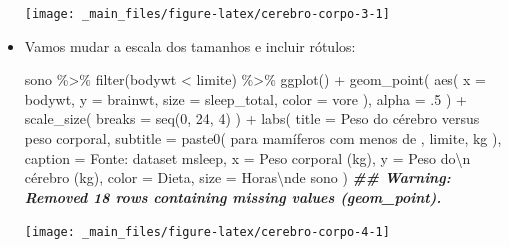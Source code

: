 \documentclass[
  11pt]{report}
\newenvironment{Shaded}{\begin{snugshade}}{\end{snugshade}}
\newcommand{\AttributeTok}[1]{\textcolor[rgb]{0.77,0.63,0.00}{#1}}
\newcommand{\DecValTok}[1]{\textcolor[rgb]{0.00,0.00,0.81}{#1}}
\newcommand{\DocumentationTok}[1]{\textcolor[rgb]{0.56,0.35,0.01}{\textbf{\textit{#1}}}}
\newcommand{\FunctionTok}[1]{\textcolor[rgb]{0.00,0.00,0.00}{#1}}
\newcommand{\NormalTok}[1]{#1}
\newcommand{\SpecialCharTok}[1]{\textcolor[rgb]{0.00,0.00,0.00}{#1}}
\newcommand{\StringTok}[1]{\textcolor[rgb]{0.31,0.60,0.02}{#1}}
\begin{document}
\begin{itemize}
  \begin{center}\texttt{[image: \_main\_files/figure-latex/cerebro-corpo-3-1]} \end{center}
\item
  Vamos mudar a escala dos tamanhos e incluir rótulos:

\begin{Shaded}
\begin{Highlighting}[]
\NormalTok{sono }\SpecialCharTok{\%\textgreater{}\%} 
  \FunctionTok{filter}\NormalTok{(bodywt }\SpecialCharTok{\textless{}}\NormalTok{ limite) }\SpecialCharTok{\%\textgreater{}\%} 
  \FunctionTok{ggplot}\NormalTok{() }\SpecialCharTok{+}
    \FunctionTok{geom\_point}\NormalTok{(}
      \FunctionTok{aes}\NormalTok{(}
        \AttributeTok{x =}\NormalTok{ bodywt, }
        \AttributeTok{y =}\NormalTok{ brainwt,}
        \AttributeTok{size =}\NormalTok{ sleep\_total,}
        \AttributeTok{color =}\NormalTok{ vore}
\NormalTok{      ), }
      \AttributeTok{alpha =}\NormalTok{ .}\DecValTok{5}
\NormalTok{    ) }\SpecialCharTok{+}
    \FunctionTok{scale\_size}\NormalTok{(}
      \AttributeTok{breaks =} \FunctionTok{seq}\NormalTok{(}\DecValTok{0}\NormalTok{, }\DecValTok{24}\NormalTok{, }\DecValTok{4}\NormalTok{)}
\NormalTok{    ) }\SpecialCharTok{+}
    \FunctionTok{labs}\NormalTok{(}
      \AttributeTok{title =} \StringTok{\textquotesingle{}Peso do cérebro versus peso corporal\textquotesingle{}}\NormalTok{,}
      \AttributeTok{subtitle =} \FunctionTok{paste0}\NormalTok{(}
        \StringTok{\textquotesingle{}para mamíferos com menos de \textquotesingle{}}\NormalTok{, }
\NormalTok{        limite, }
        \StringTok{\textquotesingle{} kg\textquotesingle{}}
\NormalTok{      ),}
      \AttributeTok{caption =} \StringTok{\textquotesingle{}Fonte: dataset \textasciigrave{}msleep\textasciigrave{}\textquotesingle{}}\NormalTok{,}
      \AttributeTok{x =} \StringTok{\textquotesingle{}Peso corporal (kg)\textquotesingle{}}\NormalTok{,}
      \AttributeTok{y =} \StringTok{\textquotesingle{}Peso do}\SpecialCharTok{\textbackslash{}n}\StringTok{ cérebro (kg)\textquotesingle{}}\NormalTok{,}
      \AttributeTok{color =} \StringTok{\textquotesingle{}Dieta\textquotesingle{}}\NormalTok{,}
      \AttributeTok{size =} \StringTok{\textquotesingle{}Horas}\SpecialCharTok{\textbackslash{}n}\StringTok{de sono\textquotesingle{}}
\NormalTok{    )}
\DocumentationTok{\#\# Warning: Removed 18 rows containing missing values (geom\_point).}
\end{Highlighting}
\end{Shaded}

  \begin{center}\texttt{[image: \_main\_files/figure-latex/cerebro-corpo-4-1]} \end{center}
\end{itemize}
\end{document}
